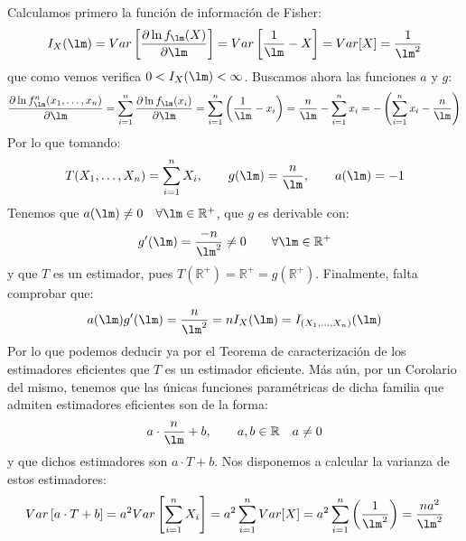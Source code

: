 \begin{ejercicio}
\begin{enumerate}[label=\alph*)]
            Calculamos primero la función de información de Fisher:
            \begin{equation*}
                I_X(\lm) = Var\left[\dfrac{\partial \ln f_\lm(X)}{\partial \lm}\right] = Var\left[\frac{1}{\lm}-X\right] = Var[X] = \frac{1}{\lm^2}
            \end{equation*}
            que como vemos verifica $0<I_X(\lm) <\infty$. Buscamos ahora las funciones $a$ y $g$:
            \begin{equation*}
                \dfrac{\partial \ln f_\lm^n(x_1, \ldots, x_n)}{\partial \lm} = \sum_{i=1}^{n}\dfrac{\partial \ln f_\lm(x_i)}{\partial \lm} = \sum_{i=1}^{n} \left(\frac{1}{\lm}-x_i\right) = \frac{n}{\lm} - \sum_{i=1}^{n}x_i = -\left(\sum_{i=1}^{n}x_i - \frac{n}{\lm}\right)
            \end{equation*}
            Por lo que tomando:
            \begin{equation*}
                T(X_1, \ldots, X_n) = \sum_{i=1}^{n} X_i, \qquad g(\lm) = \frac{n}{\lm}, \qquad a(\lm) = -1
            \end{equation*}
            Tenemos que $a(\lm) \neq 0 \quad \forall \lm\in \mathbb{R}^+$, que $g$ es derivable con:
            \begin{equation*}
                g'(\lm) = \frac{-n}{\lm^2} \neq 0 \qquad \forall \lm\in \mathbb{R}^+
            \end{equation*}
            y que $T$ es un estimador, pues $T(\mathbb{R}^+) = \mathbb{R}^+ = g(\mathbb{R}^+)$. Finalmente, falta comprobar que:
            \begin{equation*}
                a(\lm)g'(\lm) = \frac{n}{\lm^2} = nI_X(\lm) = I_{(X_1, \ldots, X_n)}(\lm)
            \end{equation*}
            Por lo que podemos deducir ya por el Teorema de caracterización de los estimadores eficientes que $T$ es un estimador eficiente. Más aún, por un Corolario del mismo, tenemos que las únicas funciones paramétricas de dicha familia que admiten estimadores eficientes son de la forma:
            \begin{equation*}
                a\cdot \frac{n}{\lm}+b, \qquad a,b\in \mathbb{R}\quad a\neq 0
            \end{equation*}
            y que dichos estimadores son $a\cdot T+b$. Nos disponemos a calcular la varianza de estos estimadores:
            \begin{equation*}
                Var\left[a\cdot T+b\right] = a^2 Var\left[\sum_{i=1}^{n}X_i\right] = a^2\sum_{i=1}^{n}Var[X] = a^2 \sum_{i=1}^{n} \left(\frac{1}{\lm^2}\right) = \frac{na^2}{\lm^2}

\end{equation*}
\end{enumerate}
\end{ejercicio}
